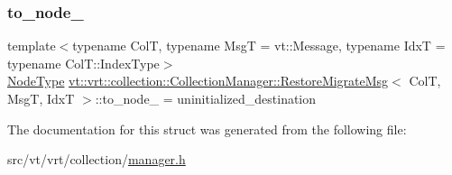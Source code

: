 \mbox{\label{structvt_1_1vrt_1_1collection_1_1_collection_manager_1_1_restore_migrate_msg_a761dcd3e0734070eb65d99990cc99081}} 
\subsubsection{\texorpdfstring{to\+\_\+node\+\_\+}{to\_node\_}}
{\footnotesize\ttfamily template$<$typename ColT, typename MsgT = vt\+::\+Message, typename IdxT = typename Col\+T\+::\+Index\+Type$>$ \\
\hyperlink{namespacevt_a866da9d0efc19c0a1ce79e9e492f47e2}{Node\+Type} \hyperlink{structvt_1_1vrt_1_1collection_1_1_collection_manager_1_1_restore_migrate_msg}{vt\+::vrt\+::collection\+::\+Collection\+Manager\+::\+Restore\+Migrate\+Msg}$<$ ColT, MsgT, IdxT $>$\+::to\+\_\+node\+\_\+ = uninitialized\+\_\+destination}



The documentation for this struct was generated from the following file\+:\begin{DoxyCompactItemize}
\item 
src/vt/vrt/collection/\hyperlink{vrt_2collection_2manager_8h}{manager.\+h}\end{DoxyCompactItemize}
